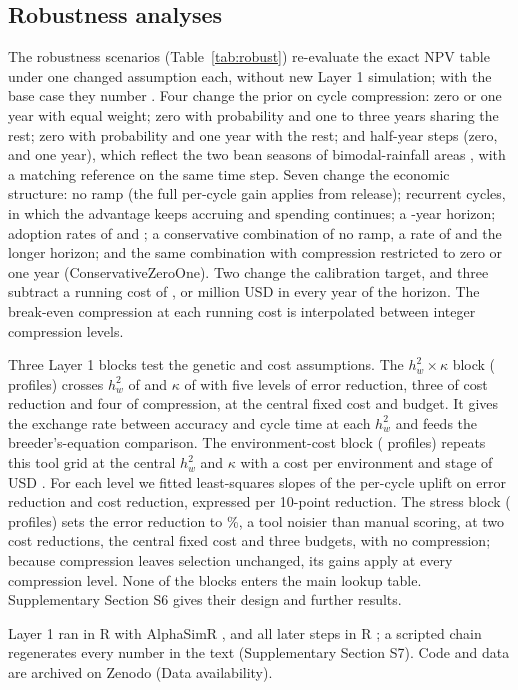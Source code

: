 \subsection{Robustness analyses}
\label{sec:robustdesign}

The robustness scenarios (Table~\ref{tab:robust}) re-evaluate the exact NPV table under one changed assumption each, without new Layer 1 simulation; with the base case they number \NumRvNscenarios. Four change the prior on cycle compression: zero or one year with equal weight; zero with probability \NumCfgZeroMassA{} and one to three years sharing the rest; zero with probability \NumCfgZeroMassB{} and one year with the rest; and half-year steps (zero, \NumCfgSeasonMid{} and one year), which reflect the two bean seasons of bimodal-rainfall areas \citep{Katungi2018Effect,Jha2023Characterizing}, with a matching reference on the same time step. Seven change the economic structure: no ramp (the full per-cycle gain applies from release); recurrent cycles, in which the advantage keeps accruing and spending continues; a \NumCfgHorizonLong{}-year horizon; adoption rates of \NumCfgKLow{} and \NumCfgKMid; a conservative combination of no ramp, a rate of \NumCfgKLow{} and the longer horizon; and the same combination with compression restricted to zero or one year (ConservativeZeroOne). Two change the calibration target, and three subtract a running cost of \NumCfgRunCostLow, \NumCfgRunCostMid{} or \NumCfgRunCostHigh{} million USD in every year of the horizon. The break-even compression at each running cost is interpolated between integer compression levels.

Three Layer 1 blocks test the genetic and cost assumptions. The $h^2_w \times \kappa$ block (\NumNcellsRobust{} profiles) crosses $h^2_w$ of \NumCfgRobHtwoLevels{} and $\kappa$ of \NumCfgRobKappaLevels{} with five levels of error reduction, three of cost reduction and four of compression, at the central fixed cost and budget. It gives the exchange rate between accuracy and cycle time at each $h^2_w$ and feeds the breeder's-equation comparison. The environment-cost block (\NumNcellsEnvCost{} profiles) repeats this tool grid at the central $h^2_w$ and $\kappa$ with a cost per environment and stage of USD \NumCfgEnvCostLevels. For each level we fitted least-squares slopes of the per-cycle uplift on error reduction and cost reduction, expressed per 10-point reduction. The stress block (\NumNcellsStress{} profiles) sets the error reduction to \NumCfgStressErr\%, a tool noisier than manual scoring, at two cost reductions, the central fixed cost and three budgets, with no compression; because compression leaves selection unchanged, its gains apply at every compression level. None of the blocks enters the main lookup table. Supplementary Section S6 gives their design and further results.

Layer 1 ran in R \NumRVersionHPC{} with AlphaSimR \NumAlphaSimRVersionHPC, and all later steps in R \NumRVersionLocal; a scripted chain regenerates every number in the text (Supplementary Section S7). Code and data are archived on Zenodo (Data availability).
